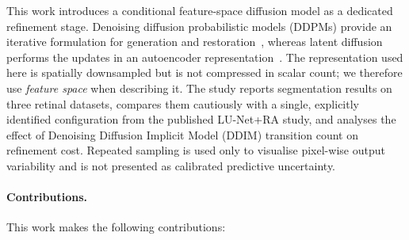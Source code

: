 \documentclass[jimaging,article,submit,pdftex,moreauthors]
  {Definitions/mdpi}
\begin{document}
This work introduces a conditional feature-space diffusion model as a dedicated refinement stage. Denoising diffusion probabilistic models (DDPMs) provide an iterative formulation for generation and restoration~\cite{Ho2020,Dhariwal2021}, whereas latent diffusion performs the updates in an autoencoder representation~\cite{Rombach2022}. The representation used here is spatially downsampled but is not compressed in scalar count; we therefore use \emph{feature space} when describing it. The study reports segmentation results on three retinal datasets, compares them cautiously with a single, explicitly identified configuration from the published LU-Net+RA study, and analyses the effect of Denoising Diffusion Implicit Model (DDIM) transition count on refinement cost. Repeated sampling is used only to visualise pixel-wise output variability and is not presented as calibrated predictive uncertainty.

\paragraph{Contributions.}
This work makes the following contributions:
\end{document}

